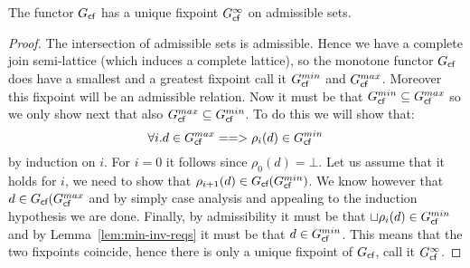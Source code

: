 \documentclass[preprint,nocopyrightspace,draft]{sigplanconf}
\begin{document}
\begin{lemma} The functor $G_{\textsf{cf}}$ has a unique fixpoint $G_{\textsf{cf}}^\infty$ on admissible sets. \end{lemma}
\begin{proof} 
The intersection of admissible sets is admissible. Hence we have a complete join semi-lattice (which induces a 
complete lattice), so the monotone functor $G_{\textsf{cf}}$ does have a smallest and a greatest fixpoint call
it $G_{\textsf{cf}}^{min}$ and $G_{\textsf{cf}}^{max}$. Moreover this fixpoint will be an admissible relation. Now it must be 
that $G_{\textsf{cf}}^{min} \subseteq G_{\textsf{cf}}^{max}$ so we only show next that
also $G_{\textsf{cf}}^{max} \subseteq G_{\textsf{cf}}^{min}$. To do this we will show that:
\[ \forall i. d \in G_{\textsf{cf}}^{max} ==> \rho_i(d) \in G_{\textsf{cf}}^{min} \] 
by induction on $i$. For $i = 0$ it follows since $\rho_0(d) = \bot$. Let us assume 
that it holds for $i$, we need to show that $\rho_{i+1}(d) \in G_{\textsf{cf}}(G_{\textsf{cf}}^{min})$.
We know however that $d \in G_{\textsf{cf}}(G_{\textsf{cf}}^{max}$ and by simply case analysis and appealing
to the induction hypothesis we are done. Finally, by admissibility it must be that
$\sqcup\rho_i(d) \in G_{\textsf{cf}}^{min}$ and by Lemma~\ref{lem:min-inv-reqs} it
must be that $d \in G_{\textsf{cf}}^{min}$. This means that the two fixpoints coincide, 
hence there is only a unique fixpoint of $G_{\textsf{cf}}$, call it $G_{\textsf{cf}}^\infty$.
\end{proof} 
\end{document}
